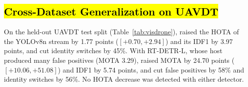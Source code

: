\subsection[Cross-Dataset Generalization on UAVDT]{\hl{Cross-Dataset Generalization on UAVDT}}\label{sec:visdrone}
On the held-out UAVDT test split (Table~\ref{tab:visdrone}), \scl{} raised the HOTA of the YOLOv8n
stream by 1.77 points ($[+0.70,+2.94]$) and its IDF1 by 3.97 points, and cut identity switches by
45\%. With RT-DETR-L, whose host produced many false positives (MOTA 3.29), \scl{} raised MOTA by
24.70 points ($[+10.06,+51.08]$) and IDF1 by 5.74 points, and cut false positives by 58\% and
identity switches by 56\%. No HOTA decrease was detected with either detector.

